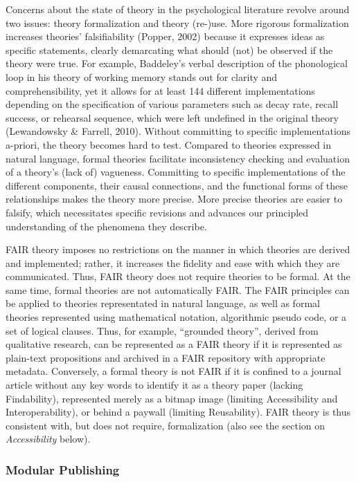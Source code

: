 \documentclass[
  man, noextraspace,floatsintext]{apa7}
\begin{document}
Concerns about the state of theory in the psychological literature revolve around two issues: theory formalization and theory (re-)use.
More rigorous formalization increases theories' falsifiability (Popper, 2002) because it expresses ideas as specific statements, clearly demarcating what should (not) be observed if the theory were true.
For example, Baddeley's verbal description of the phonological loop in his theory of working memory stands out for clarity and comprehensibility, yet it allows for at least 144 different implementations depending on the specification of various parameters such as decay rate, recall success, or rehearsal sequence, which were left undefined in the original theory (Lewandowsky \& Farrell, 2010).
Without committing to specific implementations a-priori,
the theory becomes hard to test.
Compared to theories expressed in natural language,
formal theories facilitate inconsistency checking and evaluation of a theory's (lack of) vagueness.
Committing to specific implementations of the different components, their causal connections, and the functional forms of these relationships makes the theory more precise.
More precise theories are easier to falsify,
which necessitates specific revisions and advances our principled understanding of the phenomena they describe.

FAIR theory imposes no restrictions on the manner in which theories are derived and implemented;
rather, it increases the fidelity and ease with which they are communicated.
Thus, FAIR theory does not require theories to be formal.
At the same time, formal theories are not automatically FAIR.
The FAIR principles
can be applied to theories representated in natural language,
as well as formal theories represented using mathematical notation, algorithmic pseudo code, or a set of logical clauses.
Thus, for example, ``grounded theory'', derived from qualitative research,
can be represented as a FAIR theory if it is represented as plain-text propositions and archived in a FAIR repository with appropriate metadata.
Conversely, a formal theory is not FAIR if it is confined to a journal article without any key words to identify it as a theory paper (lacking Findability), represented merely as a bitmap image (limiting Accessibility and Interoperability), or behind a paywall (limiting Reusability).
FAIR theory is thus consistent with, but does not require, formalization (also see the section on \emph{Accessibility} below).

\subsubsection{Modular Publishing}\label{modular-publishing}
\end{document}
